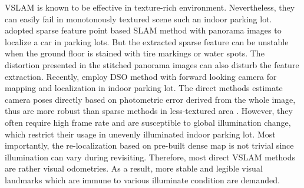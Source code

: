 \documentclass[journal]{IEEEtran}
\newcommand{\COMMENT}[1]{\textcolor{red}{#1}}
\begin{document}
%

VSLAM is known to be effective in texture-rich environment\citep{ORB}.
Nevertheless, they can easily fail in monotonously textured scene such an indoor parking lot.
\citet{VW paking} adopted sparse feature point based SLAM method with panorama images to localize a car in parking lots.
But the extracted sparse feature can be unstable when the ground floor is stained with tire markings or water spots.
The distortion presented in the stitched panorama images can also disturb the feature extraction.
Recently, \citet{Engel2017Direct} employ DSO method with forward looking camera for mapping and localization in indoor parking lot.
The direct methods estimate camera poses directly based on photometric error derived from the whole image, thus are more robust than sparse methods in less-textured area \citep{Engel2014LSD} \citep{Forster2013SVO}.
However, they often require high frame rate and are susceptible to global illumination change, which restrict their usage in unevenly illuminated indoor parking lot\citep{Younes2016A}. 
Most importantly, the re-localization based on pre-built dense map is not trivial since illumination can vary during revisiting.
Therefore, most direct VSLAM methods are rather visual odometries\citep{Engel2014LSD}.
As a result, more stable and legible visual landmarks which are immune to various illuminate condition are demanded.
\end{document}
